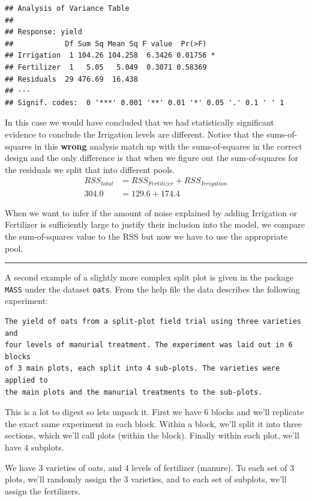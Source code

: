 \documentclass[]{book}
\theoremstyle{definition}
\theoremstyle{definition}
\theoremstyle{remark}
\begin{document}
\begin{verbatim}
## Analysis of Variance Table
## 
## Response: yield
##            Df Sum Sq Mean Sq F value  Pr(>F)  
## Irrigation  1 104.26 104.258  6.3426 0.01756 *
## Fertilizer  1   5.05   5.049  0.3071 0.58369  
## Residuals  29 476.69  16.438                  
## ---
## Signif. codes:  0 '***' 0.001 '**' 0.01 '*' 0.05 '.' 0.1 ' ' 1
\end{verbatim}

In this case we would have concluded that we had statistically
significant evidence to conclude the Irrigation levels are different.
Notice that the sums-of-squares in this \textbf{wrong} analysis match up
with the sums-of-squares in the correct design and the only difference
is that when we figure out the sum-of-squares for the residuals we split
that into different pools. \[\begin{aligned}
  RSS_{total} &= RSS_{Fertilizer} + RSS_{Irrigation} \\
        304.0 &= 129.6 + 174.4
  \end{aligned}\]

When we want to infer if the amount of noise explained by adding
Irrigation or Fertilizer is sufficiently large to justify their
inclusion into the model, we compare the sum-of-squares value to the RSS
but now we have to use the appropriate pool.

\begin{center}\rule{0.5\linewidth}{\linethickness}\end{center}

A second example of a slightly more complex split plot is given in the
package \texttt{MASS} under the dataset \texttt{oats}. From the help
file the data describes the following experiment:

\begin{verbatim}
The yield of oats from a split-plot field trial using three varieties and 
four levels of manurial treatment. The experiment was laid out in 6 blocks 
of 3 main plots, each split into 4 sub-plots. The varieties were applied to 
the main plots and the manurial treatments to the sub-plots.
\end{verbatim}

This is a lot to digest so lets unpack it. First we have 6 blocks and
we'll replicate the exact same experiment in each block. Within a block,
we'll split it into three sections, which we'll call plots (within the
block). Finally within each plot, we'll have 4 subplots.

We have 3 varieties of oats, and 4 levels of fertilizer (manure). To
each set of 3 plots, we'll randomly assign the 3 varieties, and to each
set of subplots, we'll assign the fertilizers.
\end{document}

